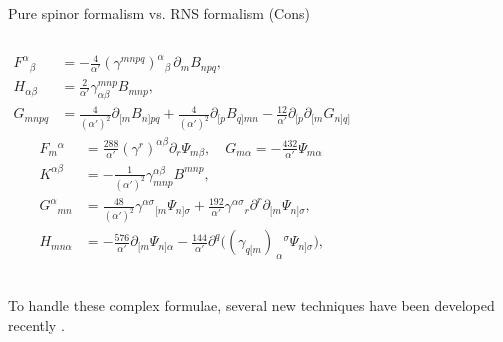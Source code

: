 \documentclass{beamer}
\begin{document}
\begin{frame}{Pure spinor formalism vs. RNS formalism (Cons)}
{\begin{columns}[t]
\begin{equation*}
\begin{aligned}
				F^{\alpha}{}_{\beta} &= -\frac{4}{\alpha'}(\gamma^{mnpq})^{\alpha}{}_{\beta}\,\partial_m B_{npq},\\[4pt]
				H_{\alpha\beta} &= \frac{2}{\alpha'}\gamma^{mnp}_{\alpha\beta}B_{mnp},\\[6pt]
				G_{mnpq} &= \frac{4}{(\alpha')^2}\partial_{[m}B_{n]pq}
				+ \frac{4}{(\alpha')^2}\partial_{[p}B_{q]mn}
				- \frac{12}{\alpha'}\partial_{[p}\partial_{[m}G_{n]q]}
				\end{aligned}
			\end{equation*}
			\begin{equation*}
			\begin{aligned}
				F_{m}{}^{\alpha} &= \frac{288}{\alpha'}(\gamma^r)^{\alpha\beta}\partial_r\Psi_{m\beta},\quad G_{m\alpha} = -\frac{432}{\alpha'}\Psi_{m\alpha}\\[4pt]
				K^{\alpha\beta} &= -\frac{1}{(\alpha')^2}\gamma^{\alpha\beta}_{mnp}B^{mnp},\\[4pt]
				G^{\alpha}{}_{mn} &= \frac{48}{(\alpha')^2}\gamma^{\alpha\sigma}{}_{[m}\Psi_{n]\sigma}
				+ \frac{192}{\alpha'}\gamma^{\alpha\sigma}{}_{r}\partial^{r}\partial_{[m}\Psi_{n]\sigma},\\[6pt]
				H_{mn\alpha} &= -\frac{576}{\alpha'}\partial_{[m}\Psi_{n]\alpha}
				- \frac{144}{\alpha'}\partial^{q}\bigl((\gamma_{q[m})_{\ \alpha}{}^{\sigma}\Psi_{n]\sigma}\bigr),\\[6pt]
			\end{aligned}
			\end{equation*}
		\end{columns}
		\vspace{12pt}
		To handle these complex formulae, several new techniques have been developed recently \cite{Kashyap:2024qor}\cite{Mafra:2024fiy}.
	}
\end{frame}
\end{document}
